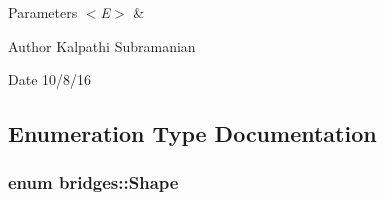 \begin{DoxyParams}{Parameters}
{\em $<$\+E$>$} & \\
\hline
\end{DoxyParams}
\begin{DoxyAuthor}{Author}
Kalpathi Subramanian 
\end{DoxyAuthor}
\begin{DoxyDate}{Date}
10/8/16 
\end{DoxyDate}


\subsection{Enumeration Type Documentation}
\hypertarget{namespacebridges_a1b4050586bd708782ae0d4f3b06b9579}{}
\subsubsection[{Shape}]{\setlength{\rightskip}{0pt plus 5cm}enum {\bf bridges\+::\+Shape}}\label{namespacebridges_a1b4050586bd708782ae0d4f3b06b9579}
